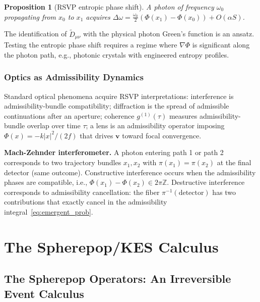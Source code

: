 \documentclass[11pt, openright, twoside]{book}
\theoremstyle{plain}
\newtheorem{proposition}[theorem]{Proposition}
\theoremstyle{definition}
\theoremstyle{remark}
\newcommand{\vfield}{\mathbf{v}}
\newcommand{\Sfield}{S}
\newcommand{\proj}{\pi}
\begin{document}
\begin{proposition}[RSVP entropic phase shift]
A photon of frequency $\omega_0$ propagating from $x_0$ to $x_1$ acquires
$\Delta\omega = \frac{\omega_0}{2}(\Phi(x_1)-\Phi(x_0))+O(\alpha\Sfield)$.
\end{proposition}

\begin{epistbox}
The identification of $\widetilde D_{\mu\nu}$ with the physical photon Green's function is
an ansatz. Testing the entropic phase shift requires a regime where $\nabla\Phi$ is
significant along the photon path, e.g., photonic crystals with engineered entropy profiles.
\end{epistbox}

\section{Optics as Admissibility Dynamics}

Standard optical phenomena acquire RSVP interpretations: interference is admissibility-bundle
compatibility; diffraction is the spread of admissible continuations after an aperture;
coherence $g^{(1)}(\tau)$ measures admissibility-bundle overlap over time $\tau$; a lens
is an admissibility operator imposing $\Phi(x)=-k|x|^2/(2f)$ that drives $\vfield$ toward
focal convergence.

\begin{exbox}
\textbf{Mach-Zehnder interferometer.} A photon entering path 1 or path 2 corresponds to
two trajectory bundles $x_1,x_2$ with $\proj(x_1)=\proj(x_2)$ at the final detector (same
outcome). Constructive interference occurs when the admissibility phases are compatible,
i.e., $\Phi(x_1)-\Phi(x_2)\in 2\pi\mathbb{Z}$. Destructive interference corresponds to
admissibility cancellation: the fiber $\proj^{-1}(\text{detector})$ has two contributions
that exactly cancel in the admissibility integral~\eqref{eq:emergent_prob}.
\end{exbox}

\part{The Spherepop/KES Calculus}

\chapter{The Spherepop Operators: An Irreversible Event Calculus}
\label{ch:spherepop}
\end{document}
